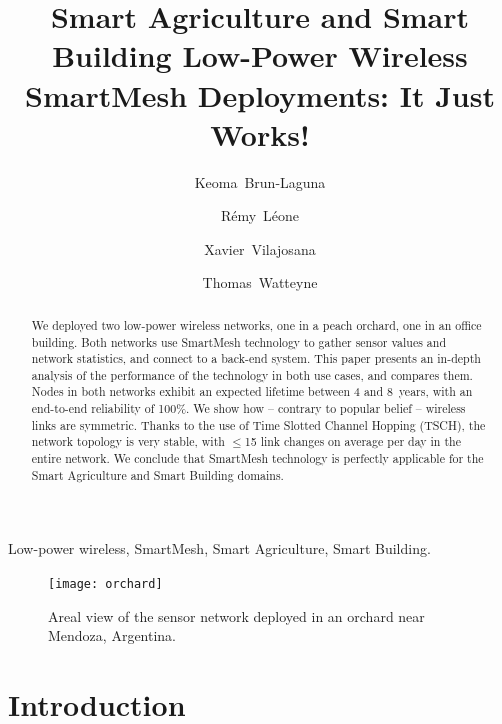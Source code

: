 \documentclass{elsarticle}
\begin{document}
\begin{frontmatter}

\date{}

\title{Smart Agriculture and Smart Building Low-Power Wireless SmartMesh Deployments: It Just Works!}

\author[inria]{Keoma~Brun-Laguna}
\author[inria]{R\'emy~L\'eone}
\author[uoc]{Xavier~Vilajosana}
\author[inria]{Thomas~Watteyne}

\address[inria]{~Inria, EVA team, Paris, France}
\address[uoc]{~Univ. Oberta de Catalunya, Barcelona, Catalonia, Spain}

\begin{abstract}
We deployed two low-power wireless networks, one in a peach orchard, one in an office building.
Both networks use SmartMesh technology to gather sensor values and network statistics, and connect to a back-end system.
This paper presents an in-depth analysis of the performance of the technology in both use cases, and compares them.
Nodes in both networks exhibit an expected lifetime between 4 and 8~years, with an end-to-end reliability of 100\%.
We show how -- contrary to popular belief -- wireless links are symmetric.
Thanks to the use of Time Slotted Channel Hopping (TSCH), the network topology is very stable, with $\leq$15 link changes on average per day in the entire network.
We conclude that SmartMesh technology is perfectly applicable for the Smart Agriculture and Smart Building domains.
\end{abstract}

\begin{keyword}
Low-power wireless, SmartMesh, Smart Agriculture, Smart Building.
\end{keyword}

\end{frontmatter}


\begin{figure}
    \centering
    \texttt{[image: orchard]}
    \caption{Areal view of the sensor network deployed in an orchard near Mendoza, Argentina.}
    \label{fig:orchard}
\end{figure}

\section{Introduction}
\label{sec:intro}
\end{document}
